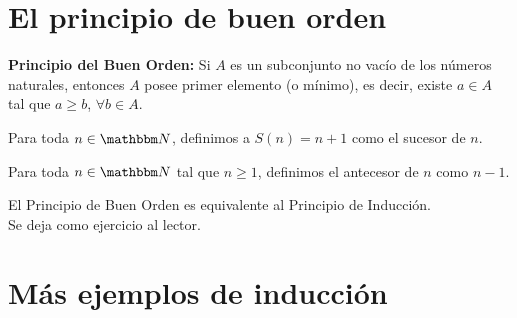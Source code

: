 \section{El principio de buen orden}

\noindent\textbf{Principio del Buen Orden:} Si $A$ es un subconjunto no vacío de los números naturales, entonces $A$ posee primer elemento (o mínimo), es decir, existe $a \in A$ tal que $a \geq b$, $\forall b \in A$.

\begin{definition}
    Para toda $n \in \NN$, definimos a $S(n)=n+1$ como el sucesor de $n$.
\end{definition}

\begin{definition}
    Para toda $n \in \NN$ tal que $n \geq 1$, definimos el antecesor de $n$ como $n-1$.
\end{definition}

\begin{theorem}
    El Principio de Buen Orden es equivalente al Principio de Inducción. \\
    \demostracion Se deja como ejercicio al lector.
\end{theorem}

\section{Más ejemplos de inducción}

